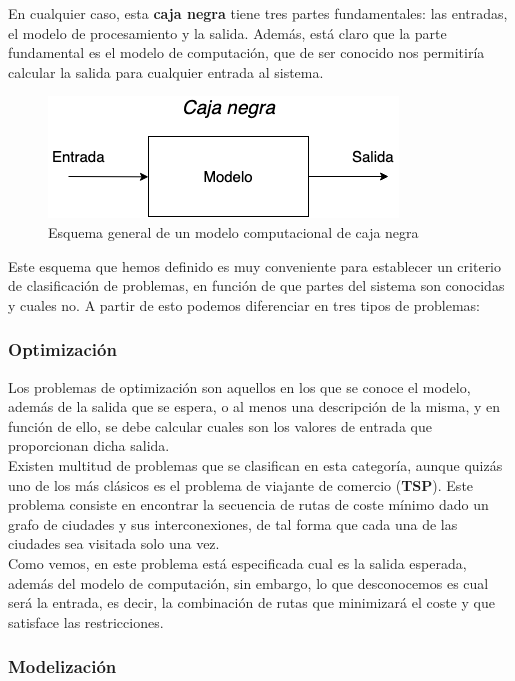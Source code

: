 En cualquier caso, esta \textbf{caja negra} tiene tres partes fundamentales: las entradas, el modelo de procesamiento y la salida. Además, está claro que la parte fundamental es el modelo de computación, que de ser conocido nos permitiría calcular la salida para cualquier entrada al sistema. \\

\begin{figure}[ht]
    \centering
    \includegraphics[scale=0.6]{mem/images/cap-1/1-1.png}
    \caption{Esquema general de un modelo computacional de caja negra}
    \label{fig:my_label}
\end{figure}

Este esquema que hemos definido es muy conveniente para establecer un criterio de clasificación de problemas, en función de que partes del sistema son conocidas y cuales no. A partir de esto podemos diferenciar en tres tipos de problemas:

\subsubsection{Optimización}
Los problemas de optimización son aquellos en los que se conoce el modelo, además de la salida que se espera, o al menos una descripción de la misma, y en función de ello, se debe calcular cuales son los valores de entrada que proporcionan dicha salida. \\

Existen multitud de problemas que se clasifican en esta categoría, aunque quizás uno de los más clásicos es el problema de viajante de comercio (\textbf{TSP}). Este problema consiste en encontrar la secuencia de rutas de coste mínimo dado un grafo de ciudades y sus interconexiones, de tal forma que cada una de las ciudades sea visitada solo una vez.\\

Como vemos, en este problema está especificada cual es la salida esperada, además del modelo de computación, sin embargo, lo que desconocemos es cual será la entrada, es decir, la combinación de rutas que minimizará el coste y que satisface las restricciones.

\subsubsection{Modelización}

